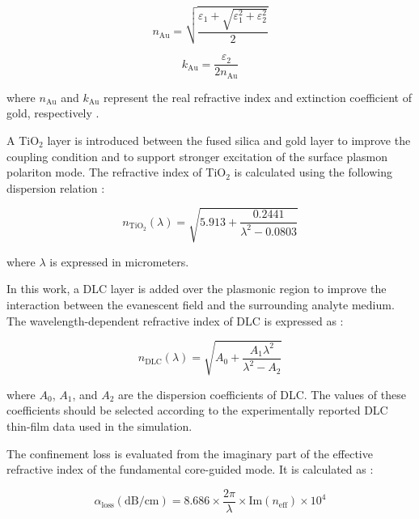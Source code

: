 \documentclass[preprint,12pt]{elsarticle}
\begin{document}
\begin{equation}
n_{\mathrm{Au}}=
\sqrt{\frac{\varepsilon_1+\sqrt{\varepsilon_1^2+\varepsilon_2^2}}{2}}
\label{eq:gold_n}
\end{equation}

\begin{equation}
k_{\mathrm{Au}}=
\frac{\varepsilon_2}{2n_{\mathrm{Au}}}
\label{eq:gold_k}
\end{equation}

where $n_{\mathrm{Au}}$ and $k_{\mathrm{Au}}$ represent the real refractive index and extinction coefficient of gold, respectively \cite{maier2007plasmonics}.

A TiO$_2$ layer is introduced between the fused silica and gold layer to improve the coupling condition and to support stronger excitation of the surface plasmon polariton mode. The refractive index of TiO$_2$ is calculated using the following dispersion relation \cite{ashrafian2025highly}:

\begin{equation}
n_{\mathrm{TiO_2}}(\lambda)=
\sqrt{
5.913+\frac{0.2441}{\lambda^2-0.0803}
}
\label{eq:tio2_ri}
\end{equation}

where $\lambda$ is expressed in micrometers.

In this work, a DLC layer is added over the plasmonic region to improve the interaction between the evanescent field and the surrounding analyte medium. The wavelength-dependent refractive index of DLC is expressed as \cite{erdogan2025diamond}:

\begin{equation}
n_{\mathrm{DLC}}(\lambda)=
\sqrt{
A_0+\frac{A_1\lambda^2}{\lambda^2-A_2}
}
\label{eq:dlc_ri}
\end{equation}

where $A_0$, $A_1$, and $A_2$ are the dispersion coefficients of DLC. The values of these coefficients should be selected according to the experimentally reported DLC thin-film data used in the simulation.

The confinement loss is evaluated from the imaginary part of the effective refractive index of the fundamental core-guided mode. It is calculated as \cite{zhang2025highly}:

\begin{equation}
\alpha_{\mathrm{loss}}(\mathrm{dB/cm})=
8.686\times\frac{2\pi}{\lambda}
\times \mathrm{Im}(n_{\mathrm{eff}})\times 10^4
\label{eq:confinement_loss}
\end{equation}
\end{document}

